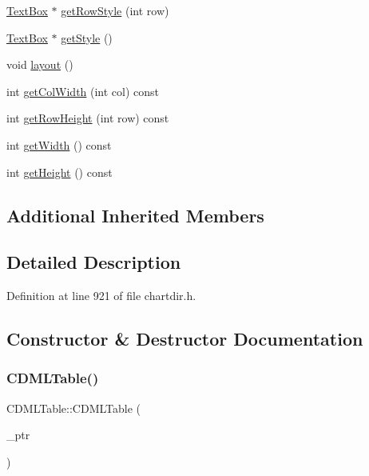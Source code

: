 \begin{DoxyCompactItemize}
\item 
\hyperlink{class_text_box}{Text\+Box} $\ast$ \hyperlink{class_c_d_m_l_table_a02ec17c1c346f6da4e61d17147aa90a2}{get\+Row\+Style} (int row)
\item 
\hyperlink{class_text_box}{Text\+Box} $\ast$ \hyperlink{class_c_d_m_l_table_af43e533e15a7d7af5699bb7b695f30ba}{get\+Style} ()
\item 
void \hyperlink{class_c_d_m_l_table_a78682ffb191bc413e1d1790399e4aeed}{layout} ()
\item 
int \hyperlink{class_c_d_m_l_table_a9f6a813b023cbce808d94adef12533e6}{get\+Col\+Width} (int col) const
\item 
int \hyperlink{class_c_d_m_l_table_a3cf2436c72b48dd1f97fb9ffd26c96be}{get\+Row\+Height} (int row) const
\item 
int \hyperlink{class_c_d_m_l_table_abe6213c358907a33d677ee3c18c74199}{get\+Width} () const
\item 
int \hyperlink{class_c_d_m_l_table_a9783be404eca3a6685dd0ea58dcbb27d}{get\+Height} () const
\end{DoxyCompactItemize}
\subsection*{Additional Inherited Members}


\subsection{Detailed Description}


Definition at line 921 of file chartdir.\+h.



\subsection{Constructor \& Destructor Documentation}
\mbox{\label{class_c_d_m_l_table_a88e819b536ce3deca496ff54224bc939}} 
\subsubsection{\texorpdfstring{C\+D\+M\+L\+Table()}{CDMLTable()}}
{\footnotesize\ttfamily C\+D\+M\+L\+Table\+::\+C\+D\+M\+L\+Table (\begin{DoxyParamCaption}\item[{C\+D\+M\+L\+Table\+Internal $\ast$}]{\+\_\+ptr }\end{DoxyParamCaption})\hspace{0.3cm}{\ttfamily [inline]}}



